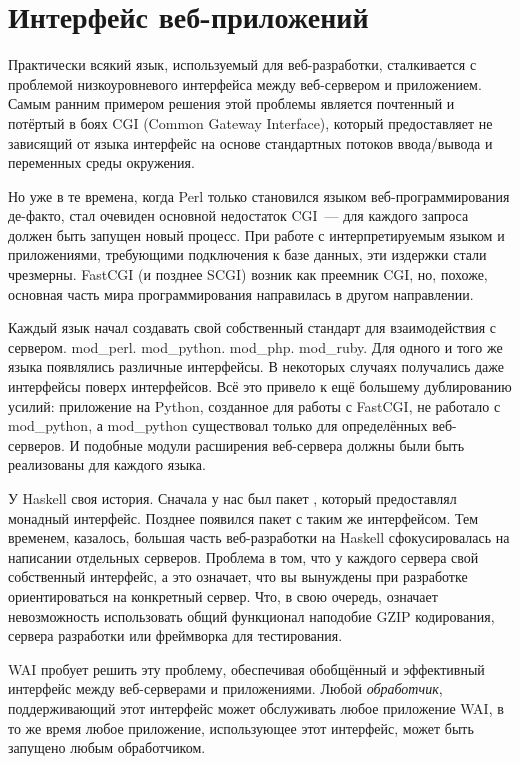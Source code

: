 \chapter{Интерфейс веб-приложений}\label{chap:web_application_interface}

Практически всякий язык, используемый для веб-разработки, сталкивается с
проблемой низкоуровневого интерфейса между веб-сервером и приложением. Самым
ранним примером решения этой проблемы является почтенный и потёртый в боях CGI
(Common Gateway Interface), который предоставляет не зависящий от языка
интерфейс на основе стандартных потоков ввода/вывода и переменных среды
окружения.

Но уже в те времена, когда Perl только становился языком веб-программирования
де-факто, стал очевиден основной недостаток CGI~--- для каждого запроса должен
быть запущен новый процесс. При работе с интерпретируемым языком и
приложениями, требующими подключения к базе данных, эти издержки стали
чрезмерны. FastCGI (и позднее SCGI) возник как преемник CGI, но, похоже,
основная часть мира программирования направилась в другом направлении.

Каждый язык начал создавать свой собственный стандарт для взаимодействия с
сервером.  mod\_perl. mod\_python. mod\_php. mod\_ruby. Для одного и того же
языка появлялись различные интерфейсы. В некоторых случаях получались даже
интерфейсы поверх интерфейсов.  Всё это привело к ещё большему дублированию
усилий: приложение на Python, созданное для работы с FastCGI, не работало с
mod\_python, а mod\_python существовал только для определённых веб-серверов. И
подобные модули расширения веб-сервера должны были быть реализованы для каждого
языка.

У Haskell своя история. Сначала у нас был пакет
, который
предоставлял монадный интерфейс. Позднее появился пакет
 с таким же
интерфейсом.  Тем временем, казалось, большая часть веб-разработки на Haskell
сфокусировалась на написании отдельных серверов.  Проблема в том, что у каждого
сервера свой собственный интерфейс, а это означает, что вы вынуждены при
разработке ориентироваться на конкретный сервер. Что, в свою очередь, означает
невозможность использовать общий функционал наподобие GZIP кодирования, сервера
разработки или фреймворка для тестирования.

WAI пробует решить эту проблему, обеспечивая обобщённый и эффективный интерфейс
между веб-серверами и приложениями. Любой \emph{обработчик}, поддерживающий
этот интерфейс может обслуживать любое приложение WAI, в то же время любое
приложение, использующее этот интерфейс, может быть запущено любым
обработчиком.

